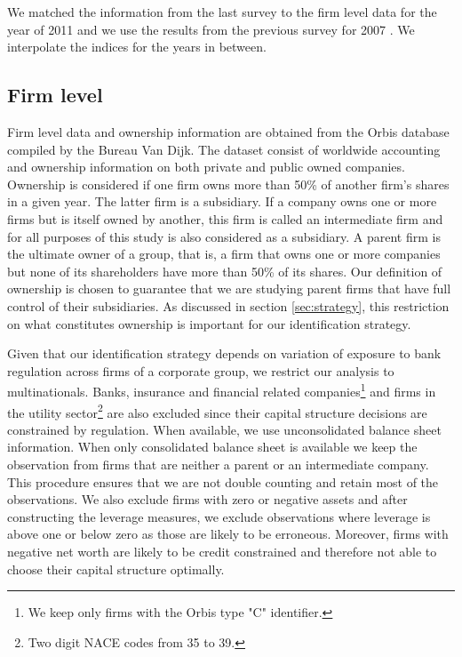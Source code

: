 \documentclass[12pt]{article}
\begin{document}
	  We matched the information from the last survey to the firm level data for the year of 2011 and we use the results from the previous survey for 2007 \citep{barth2008bank}. We interpolate the indices for the years in between.  	   
	  	
 	\subsection{Firm level} \label{subsec:firm}
	Firm level data and ownership information are obtained from the Orbis database compiled by the Bureau Van Dijk. The dataset consist of worldwide accounting and ownership information on both private and public owned companies.  Ownership is considered if one firm owns more than 50\% of another firm's shares in a given year. The latter firm is a subsidiary. If a company owns one or more firms but is itself owned by another, this firm is called an intermediate firm and for all purposes of this study is also considered as a subsidiary. A parent firm is the ultimate owner of a group, that is, a firm that owns one or more companies but none of its shareholders have more than 50\% of its shares. Our definition of ownership is chosen to guarantee that we are studying parent firms that have full control of their subsidiaries. As discussed in section \ref{sec:strategy}, this restriction on what constitutes ownership is important for our identification strategy. 
	
	Given that our identification strategy depends on variation of exposure to bank regulation across firms of a corporate group, we restrict our analysis to multinationals. Banks, insurance and financial related companies\footnote{We keep only firms with the Orbis type "C" identifier.} and firms in the utility sector\footnote{Two digit NACE codes from 35 to 39.} are also excluded since their capital structure decisions are constrained by regulation. When available, we use unconsolidated balance sheet information. When only consolidated balance sheet is available we keep the observation from firms that are neither a parent or an intermediate company. This procedure ensures that we are not double counting and retain most of the observations. We also exclude firms with zero or negative assets and after constructing the leverage measures, we exclude observations where leverage is above one or below zero as those are likely to be erroneous. Moreover, firms with negative net worth are likely to be credit constrained and therefore not able to choose their capital structure optimally. 
	
\end{document}
